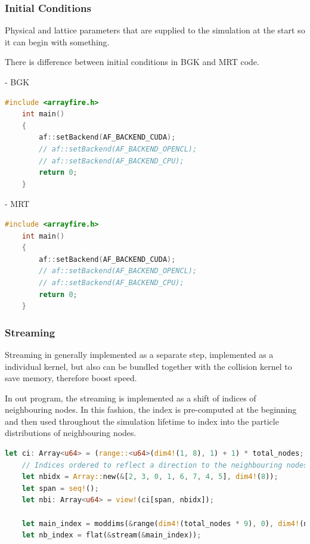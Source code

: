 \subsubsection{Initial Conditions}

Physical and lattice parameters that are supplied to the simulation at the start so it can begin with something.

There is difference between initial conditions in BGK and MRT code.

- BGK \\

\begin{lstlisting}[language=Cpp, caption=C++ code for setting different computing backends., label=cpp-backends]
	#include <arrayfire.h>
	int main()
	{
		af::setBackend(AF_BACKEND_CUDA);
		// af::setBackend(AF_BACKEND_OPENCL);
		// af::setBackend(AF_BACKEND_CPU);
		return 0;
	}
\end{lstlisting}

- MRT \\

\begin{lstlisting}[language=Cpp, caption=C++ code for setting different computing backends., label=cpp-backends]
	#include <arrayfire.h>
	int main()
	{
		af::setBackend(AF_BACKEND_CUDA);
		// af::setBackend(AF_BACKEND_OPENCL);
		// af::setBackend(AF_BACKEND_CPU);
		return 0;
	}
\end{lstlisting}

\subsubsection{Streaming}

Streaming in generally implemented as a separate step, implemented as a individual kernel, but also can be bundled together with the collision kernel to save memory, therefore boost speed.

In out program, the streaming is implemented as a shift of indices of neighbouring nodes. In this fashion, the index is pre-computed at the beginning and then used throughout the simulation lifetime to index into the particle distributions of neighbouring nodes.

\begin{lstlisting}[language=Rust, caption=Pre-computed streaming step in the way of shifting indices during the program intialization phase., label=rust-nb-index]
	let ci: Array<u64> = (range::<u64>(dim4!(1, 8), 1) + 1) * total_nodes;
	// Indices ordered to reflect a direction to the neighbouring nodes
	let nbidx = Array::new(&[2, 3, 0, 1, 6, 7, 4, 5], dim4!(8));
	let span = seq!();
	let nbi: Array<u64> = view!(ci[span, nbidx]);
	
	let main_index = moddims(&range(dim4!(total_nodes * 9), 0), dim4!(nx, ny, 9));
	let nb_index = flat(&stream(&main_index));
\end{lstlisting}

